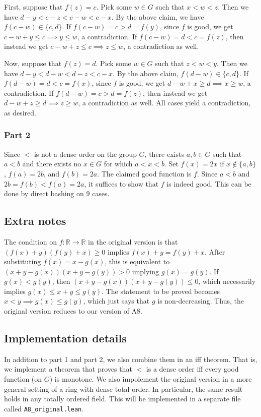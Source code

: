 \documentclass{article}
\newcommand{\R}{\mathbb{R}}
\begin{document}
First, suppose that $f(z) = c$.
Pick some $w \in G$ such that $x < w < z$.
Then we have $d - y < c - z < c - w < c - x$.
By the above claim, we have $f(c - w) \in \{c, d\}$.
If $f(c - w) = c > d = f(y)$, since $f$ is good, we get $c - w + y \leq c \implies y \leq w$, a contradiction.
If $f(c - w) = d < c = f(z)$, then instead we get $c - w + z \leq c \implies z \leq w$, a contradiction as well.

Now, suppose that $f(z) = d$.
Pick some $w \in G$ such that $z < w < y$.
Then we have $d - y < d - w < d - z < c - x$.
By the above claim, $f(d - w) \in \{c, d\}$.
If $f(d - w) = d < c = f(x)$, since $f$ is good, we get $d - w + x \geq d \implies x \geq w$, a contradiction.
If $f(d - w) = c > d = f(z)$, then instead we get $d - w + z \geq d \implies z \geq w$, a contradiction as well.
All cases yield a contradiction, as desired.


\subsubsection*{Part 2}

Since $<$ is not a dense order on the group $G$, there exists $a, b \in G$ such that $a < b$ and there exists no $x \in G$ for which $a < x < b$.
Set $f(x) = 2x$ if $x \notin \{a, b\}$, $f(a) = 2b$, and $f(b) = 2a$.
The claimed good function is $f$.
Since $a < b$ and $2b = f(b) < f(a) = 2a$, it suffices to show that $f$ is indeed good.
This can be done by direct bashing on 9 cases.



\subsection*{Extra notes}

The condition on $f : \R \to \R$ in the original version is that $(f(x) + y)(f(y) + x) \geq 0$ implies $f(x) + y = f(y) + x$.
After substituting $f(x) = x - g(x)$, this is equivalent to $(x + y - g(x))(x + y - g(y)) > 0$ implying $g(x) = g(y)$.
If $g(x) < g(y)$, then $(x + y - g(x))(x + y - g(y)) \leq 0$, which necessarily implies $g(x) \leq x + y \leq g(y)$.
The statement to be proved becomes $x < y \implies g(x) \leq g(y)$, which just says that $g$ is non-decreasing.
Thus, the original version reduces to our version of A8.



\subsection*{Implementation details}

In addition to part 1 and part 2, we also combine them in an iff theorem.
That is, we implement a theorem that proves that $<$ is a dense order iff every good function (on $G$) is monotone.
We also impolement the original version in a more general setting of a ring with dense total order.
In particular, the same result holds in any totally ordered field.
This will be implemented in a separate file called \texttt{A8\_original.lean}.
\end{document}
